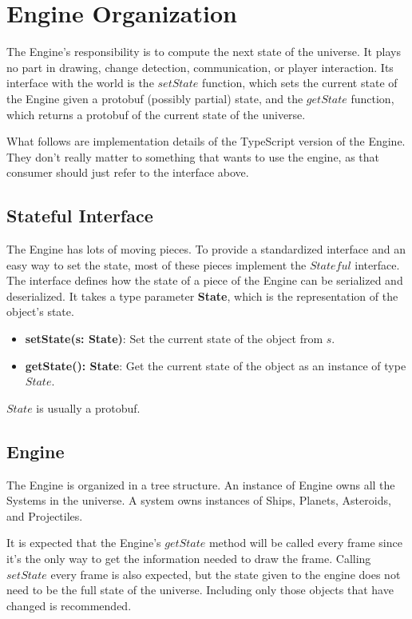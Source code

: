 \documentclass{article}
\begin{document}
\section{Engine Organization}
The Engine's responsibility is to compute the next state of the universe. It plays no part in drawing, change detection, communication, or player interaction. Its interface with the world is the $setState$ function, which sets the current state of the Engine given a protobuf (possibly partial) state, and the $getState$ function, which returns a protobuf of the current state of the universe.

What follows are implementation details of the TypeScript version of the Engine. They don't really matter to something that wants to use the engine, as that consumer should just refer to the interface above.

\subsection{Stateful Interface}
The Engine has lots of moving pieces. To provide a standardized interface and an easy way to set the state, most of these pieces implement the $Stateful$ interface. The interface defines how the state of a piece of the Engine can be serialized and deserialized. It takes a type parameter \textbf{State}, which is the representation of the object's state.

\begin{itemize}
\item[]\textbf{setState(s: State)}: Set the current state of the object from $s$.
\item[]\textbf{getState(): State}: Get the current state of the object as an instance of type $State$.
\end{itemize}

$State$ is usually a protobuf.


\subsection{Engine}
The Engine is organized in a tree structure. An instance of Engine owns all the Systems in the universe. A system owns instances of Ships, Planets, Asteroids, and Projectiles.

It is expected that the Engine's $getState$ method will be called every frame since it's the only way to get the information needed to draw the frame. Calling $setState$ every frame is also expected, but the state given to the engine does not need to be the full state of the universe. Including only those objects that have changed is recommended.
\end{document}
